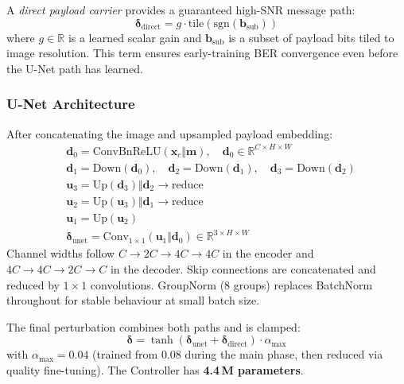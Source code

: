 \documentclass[journal]{IEEEtran}
\newcommand{\R}{\mathbb{R}}
\begin{document}
A \emph{direct payload carrier} provides a guaranteed high-SNR message path:
\begin{equation}
    \bm{\delta}_\text{direct} = g\cdot\text{tile}\!\left(\mathrm{sgn}(\mathbf{b}_\text{sub})\right)
    \label{eq:direct}
\end{equation}
where $g\in\R$ is a learned scalar gain and $\mathbf{b}_\text{sub}$ is a subset of payload
bits tiled to image resolution.
This term ensures early-training BER convergence even before the U-Net path has learned.

\subsubsection{U-Net Architecture}
After concatenating the image and upsampled payload embedding:
\begin{align}
    &\mathbf{d}_0 = \mathrm{ConvBnReLU}(\mathbf{x}_c \Vert \mathbf{m}),
        \quad \mathbf{d}_0\in\R^{C\times H\times W}       \label{eq:enc0} \\
    &\mathbf{d}_1 = \mathrm{Down}(\mathbf{d}_0),\quad \mathbf{d}_2 = \mathrm{Down}(\mathbf{d}_1),
        \quad \mathbf{d}_3 = \mathrm{Down}(\mathbf{d}_2)  \label{eq:enc} \\
    &\mathbf{u}_3 = \mathrm{Up}(\mathbf{d}_3)\Vert\mathbf{d}_2 \to \mathrm{reduce}   \label{eq:dec} \\
    &\mathbf{u}_2 = \mathrm{Up}(\mathbf{u}_3)\Vert\mathbf{d}_1 \to \mathrm{reduce}   \nonumber\\
    &\mathbf{u}_1 = \mathrm{Up}(\mathbf{u}_2)                                         \nonumber\\
    &\bm{\delta}_\text{unet} = \mathrm{Conv}_{1\times1}\!\left(\mathbf{u}_1\Vert\mathbf{d}_0\right)
        \in\R^{3\times H\times W}                          \label{eq:final}
\end{align}
Channel widths follow $C\to2C\to4C\to4C$ in the encoder and $4C\to4C\to2C\to C$ in the decoder.
Skip connections are concatenated and reduced by $1\times1$ convolutions.
GroupNorm (8 groups) replaces BatchNorm throughout for stable behaviour at small batch size.

The final perturbation combines both paths and is clamped:
\begin{equation}
    \bm{\delta} = \tanh\!\left(\bm{\delta}_\text{unet} + \bm{\delta}_\text{direct}\right)\cdot\alpha_\text{max}
    \label{eq:delta_final}
\end{equation}
with $\alpha_\text{max}=0.04$ (trained from $0.08$ during the main phase, then reduced via
quality fine-tuning).
The Controller has \textbf{4.4\,M parameters}.
\end{document}
